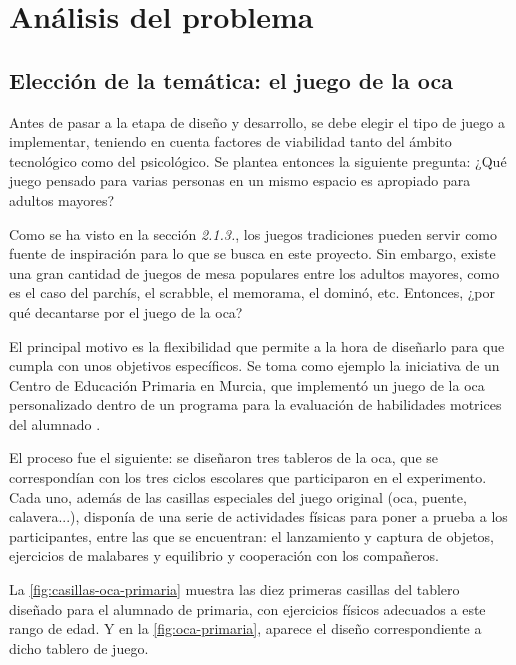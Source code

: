 \section{Análisis del problema}

\subsection{Elección de la temática: el juego de la oca}

Antes de pasar a la etapa de diseño y desarrollo, se debe elegir el tipo de juego a implementar, teniendo en cuenta factores de viabilidad tanto del ámbito tecnológico como del psicológico. Se plantea entonces la siguiente pregunta: ¿Qué juego pensado para varias personas en un mismo espacio es apropiado para adultos mayores?

Como se ha visto en la sección \textit{2.1.3.}, los juegos tradiciones pueden servir como fuente de inspiración para lo que se busca en este proyecto. Sin embargo, existe una gran cantidad de juegos de mesa populares entre los adultos mayores, como es el caso del parchís, el scrabble, el memorama, el dominó, etc. Entonces, ¿por qué decantarse por el juego de la oca?

El principal motivo es la flexibilidad que permite a la hora de diseñarlo para que cumpla con unos objetivos específicos. Se toma como ejemplo la iniciativa de un Centro de Educación Primaria en Murcia, que implementó un juego de la oca personalizado dentro de un programa para la evaluación de habilidades motrices del alumnado \parencite{experienciaOca}.

El proceso fue el siguiente: se diseñaron tres tableros de la oca, que se correspondían con los tres ciclos escolares que participaron en el experimento. Cada uno, además de las casillas especiales del juego original (oca, puente, calavera...), disponía de una serie de actividades físicas para poner a prueba a los participantes, entre las que se encuentran: el lanzamiento y captura de objetos, ejercicios de malabares y equilibrio y cooperación con los compañeros.

La \autoref{fig:casillas-oca-primaria} muestra las diez primeras casillas del tablero diseñado para el alumnado de primaria, con ejercicios físicos adecuados a este rango de edad. Y en la \autoref{fig:oca-primaria}, aparece el diseño correspondiente a dicho tablero de juego.

